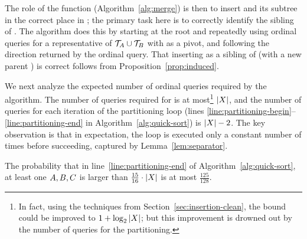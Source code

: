 The role of the \Merge function (Algorithm~\ref{alg:merge}) is then to
insert \VertexBar and its subtree in the correct place in \TreeC;
the primary task here is to correctly identify the sibling \Vertex of \VertexBar.
The algorithm does this by starting at the root and repeatedly using
ordinal queries for a representative \element \ElS of
$\TreeA \cup \TreeB$ with \Vertex as a pivot,
and following the direction returned by the ordinal query.
That inserting \VertexBar as a sibling of \Vertex
(with a new parent \VertexP) is correct follows from
Proposition~\ref{prop:induced}.


We next analyze the expected number of ordinal queries required
by the \QuickClustering algorithm.
The number of queries required for \Merge is at most\footnote{%
In fact, using the techniques from Section~\ref{sec:insertion-clean},
the bound could be improved to $1 + \log_2 \SetCard{\ElSet}$;
but this improvement is drowned out by the number of queries
for the partitioning.}
$\SetCard{\ElSet}$,
and the number of queries for each iteration of the partitioning loop
(lines \ref{line:partitioning-begin}--\ref{line:partitioning-end}
in Algorithm~\ref{alg:quick-sort})
is $\SetCard{\ElSet} - 2$.
The key observation is that in expectation,
the loop is executed only a constant number of times
before succeeding, captured by Lemma~\ref{lem:separator}.

\begin{lemma} \label{lem:separator}
The probability that in line~\ref{line:partitioning-end}
of Algorithm~\ref{alg:quick-sort},
at least one $A, B, C$
is larger than $\frac{15}{16} \cdot \SetCard{\ElSet}$
is at most $\frac{125}{128}$.
\end{lemma}

